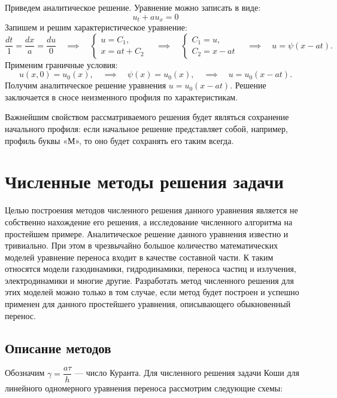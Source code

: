 \documentclass[12pt, a4paper]{article}
\begin{document}
Приведем аналитическое решение. Уравнение можно записать в виде:
\begin{equation*}
	u_t + a u_x = 0
\end{equation*}
Запишем и решим характеристическое уравнение:
\begin{equation*}
	\dfrac{dt}{1} = \dfrac{dx}{a} = \dfrac{du}{0} \quad \implies  \quad 
	\begin{cases}
		u = C_1,\\
		x = a t + C_2
	\end{cases} 
	\quad \implies \quad
	\begin{cases}
		C_1 = u,\\
		C_2 = x - at
	\end{cases}
	 \quad \implies \quad
	 u = \psi(x-a t).
\end{equation*}
Применим граничные условия:
\begin{equation*}
	u(x, 0) = u_0(x),
	\quad \implies \quad
	\psi(x) = u_0(x),
	 \quad \implies \quad
	 u = u_0(x-a t).
\end{equation*}
Получим аналитическое решение уравнения $u = u_0(x-at)$. Решение заключается в сносе неизменного профиля по характеристикам. 

Важнейшим свойством рассматриваемого решения будет являться сохранение начального профиля: если начальное решение представляет собой, например, профиль буквы «М», то оно будет сохранять его таким всегда.

\section{Численные методы решения задачи}
Целью построения методов численного решения данного уравнения является не собственно нахождение его решения, а исследование численного алгоритма на простейшем примере. Аналитическое решение данного уравнения известно и тривиально. При этом в чрезвычайно большое количество математических моделей уравнение переноса входит в качестве составной части. К таким относятся модели газодинамики, гидродинамики, переноса частиц и излучения, электродинамики и многие другие. Разработать метод численного решения для этих моделей можно только в том случае, если метод будет построен и успешно применен для данного простейшего уравнения, описывающего обыкновенный перенос.\cite{1}
\subsection{Описание методов}
Обозначим $\gamma =  \dfrac{a \tau}{h}$ --- число Куранта. Для численного решения задачи Коши для линейного одномерного уравнения переноса рассмотрим следующие схемы:
\end{document}
